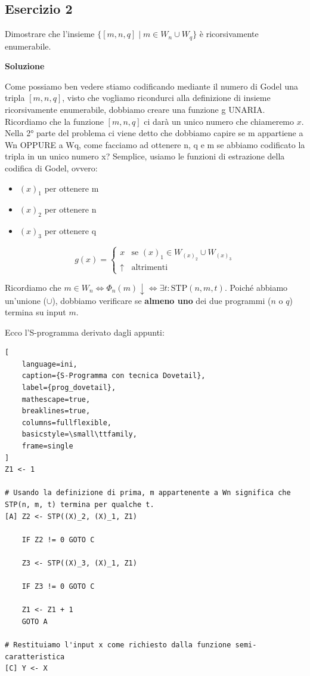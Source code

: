 \subsection{Esercizio 2}

Dimostrare che l'insieme $\{ [m, n, q] \mid m \in W_n \cup W_q \}$ è ricorsivamente enumerabile.

\textbf{Soluzione}

Come possiamo ben vedere stiamo codificando mediante il numero di Godel una tripla $[m, n, q]$, visto che vogliamo ricondurci alla definizione di insieme ricorsivamente enumerabile, dobbiamo creare una funzione g UNARIA.
Ricordiamo che la funzione $[m, n, q]$ ci darà un unico numero che chiameremo $x$. Nella 2° parte del problema ci viene detto che dobbiamo capire se m appartiene a Wn OPPURE a Wq, come facciamo ad ottenere n, q e m se abbiamo codificato la tripla in un unico numero x? 
Semplice, usiamo le funzioni di estrazione della codifica di Godel, ovvero:

\begin{itemize}
  \item $ (x)_1 $ per ottenere m
  \item $ (x)_2 $ per ottenere n
  \item $ (x)_3 $ per ottenere q
\end{itemize} 

$$
g(x) = \begin{cases}
x & \text{se } (x)_1 \in W_{(x)_2} \cup W_{(x)_3} \\
\uparrow & \text{altrimenti}
\end{cases}
$$

Ricordiamo che $m \in W_n \iff \Phi_n(m) \downarrow \iff \exists t : \mathrm{STP}(n, m, t)$.
Poiché abbiamo un'unione ($\cup$), dobbiamo verificare se \textbf{almeno uno} dei due programmi ($n$ o $q$) termina su input $m$.

\newpage

Ecco l'S-programma derivato dagli appunti:

\begin{lstlisting}[
    language=ini, 
    caption={S-Programma con tecnica Dovetail}, 
    label={prog_dovetail},
    mathescape=true,       
    breaklines=true,       
    columns=fullflexible,  
    basicstyle=\small\ttfamily,
    frame=single           
]
Z1 <- 1

# Usando la definizione di prima, m appartenente a Wn significa che STP(n, m, t) termina per qualche t.
[A] Z2 <- STP((X)_2, (X)_1, Z1)
    
    IF Z2 != 0 GOTO C

    Z3 <- STP((X)_3, (X)_1, Z1)
    
    IF Z3 != 0 GOTO C

    Z1 <- Z1 + 1
    GOTO A

# Restituiamo l'input x come richiesto dalla funzione semi-caratteristica    
[C] Y <- X
\end{lstlisting}

